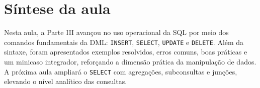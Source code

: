 \section{Síntese da aula}

Nesta aula, a Parte III avançou no uso operacional da SQL por meio dos comandos fundamentais da DML: \texttt{INSERT}, \texttt{SELECT}, \texttt{UPDATE} e \texttt{DELETE}. Além da sintaxe, foram apresentados exemplos resolvidos, erros comuns, boas práticas e um minicaso integrador, reforçando a dimensão prática da manipulação de dados. A próxima aula ampliará o \texttt{SELECT} com agregações, subconsultas e junções, elevando o nível analítico das consultas.